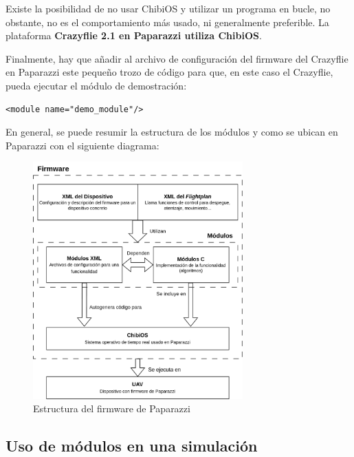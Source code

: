 Existe la posibilidad de no usar ChibiOS y utilizar un programa en bucle, no obstante, no es el comportamiento más usado, ni generalmente preferible. 
La plataforma \textbf{Crazyflie 2.1 en Paparazzi utiliza ChibiOS}. 

Finalmente, hay que añadir al archivo de configuración del firmware del Crazyflie en Paparazzi este pequeño trozo de código para que, en este caso el Crazyflie, pueda ejecutar el módulo de demostración:

\begin{lstlisting}[style=CodigoXML]
<module name="demo_module"/>
\end{lstlisting}

En general, se puede resumir la estructura de los módulos y como se ubican en Paparazzi con el siguiente diagrama:

\begin{figure}[h]
    \centering
    \includegraphics[width=0.72\textwidth]{img/fig/fig2.9-firmware-paparazzi.png}
    \caption{Estructura del firmware de Paparazzi}
    \label{fig:firmware-paparazzi}
\end{figure}


\subsection{Uso de módulos en una simulación}


